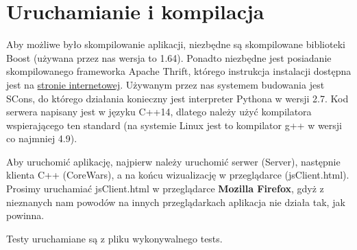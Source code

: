\chapter{Uruchamianie i kompilacja}
Aby możliwe było skompilowanie aplikacji, niezbędne są skompilowane biblioteki Boost (używana przez nas wersja to 1.64). Ponadto niezbędne jest posiadanie skompilowanego frameworka Apache Thrift, którego instrukcja instalacji dostępna jest na \href{https://thrift.apache.org/}{stronie internetowej}. Używanym przez nas systemem budowania jest SCons, do którego działania konieczny jest interpreter Pythona w wersji 2.7.
Kod serwera napisany jest w języku C++14, dlatego należy użyć kompilatora wspierającego ten standard (na systemie Linux jest to kompilator g++ w wersji co najmniej 4.9).

Aby uruchomić aplikację, najpierw należy uruchomić serwer (Server), następnie klienta C++ (CoreWars), a na końcu wizualizację w przeglądarce (jsClient.html). Prosimy uruchamiać jsClient.html w przeglądarce \textbf{Mozilla Firefox}, gdyż z nieznanych nam powodów na innych przeglądarkach aplikacja nie działa tak, jak powinna. 

Testy uruchamiane są z pliku wykonywalnego tests.